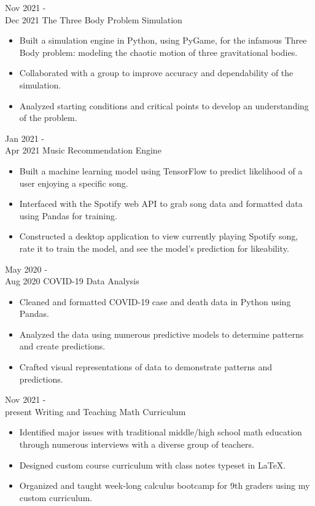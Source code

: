 \documentclass[9pt]{developercv} %
\begin{document}


\begin{entrylist}
	
	\entry
		{Nov 2021 -\\Dec 2021}
		{The Three Body Problem Simulation}
		{}
		{\begin{itemize}[noitemsep, topsep=1pt]
			\item Built a simulation engine in Python, using PyGame, for the infamous Three Body problem: modeling the chaotic motion of three gravitational bodies. 
			\item Collaborated with a group to improve accuracy and dependability of the simulation.
			\item Analyzed starting conditions and critical points to develop an understanding of the problem.
		\end{itemize}}
	\entry
		{Jan 2021 -\\Apr 2021}
		{Music Recommendation Engine}
		{}
		{\begin{itemize}[noitemsep, topsep=1pt]
			\item Built a machine learning model using TensorFlow to predict likelihood of a user enjoying a specific song.
			\item Interfaced with the Spotify web API to grab song data and formatted data using Pandas for training. 
			\item Constructed a desktop application to view currently playing Spotify song, rate it to train the model, and see the model's prediction for likeability. 
		\end{itemize}}
	\entry 
		{May 2020 -\\Aug 2020}
		{COVID-19 Data Analysis}
		{}
		{\begin{itemize}[noitemsep, topsep=1pt]
			\item Cleaned and formatted COVID-19 case and death data in Python using Pandas.
			\item Analyzed the data using numerous predictive models to determine patterns and create predictions. 
			\item Crafted visual representations of data to demonstrate patterns and predictions. 
		\end{itemize}}
	\entry
		{Nov 2021 -\\present}
		{Writing and Teaching Math Curriculum}
		{}
		{\begin{itemize}[noitemsep, topsep=1pt]
			\item Identified major issues with traditional middle/high school math education through numerous
			interviews with a diverse group of teachers.
			\item Designed custom course curriculum with class notes typeset in LaTeX.
			\item Organized and taught week-long calculus bootcamp for 9th graders using my custom curriculum.
		\end{itemize}}
\end{entrylist}
\end{document}
